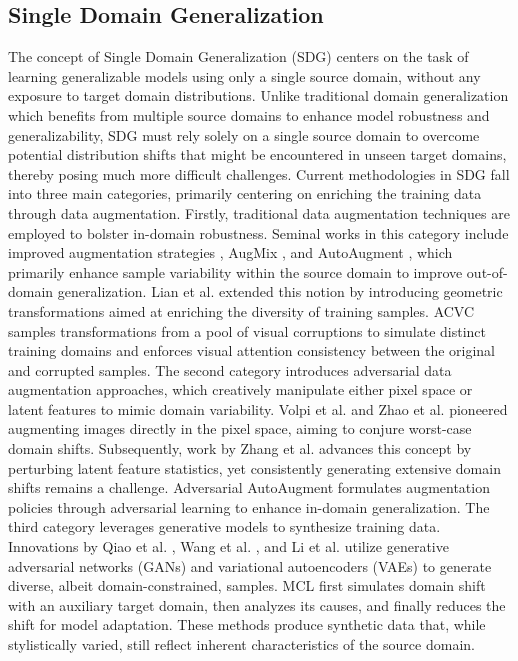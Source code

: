 \subsection{Single Domain Generalization}
The concept of Single Domain Generalization (SDG) centers on 
the task of learning generalizable models using only a single source domain, without any exposure to target domain distributions. 
Unlike traditional domain generalization which benefits from multiple source domains to enhance model robustness and generalizability, 
SDG must rely solely on a single source domain to overcome potential distribution shifts that might be encountered in unseen target domains,
thereby posing much more difficult challenges. 
Current methodologies in SDG fall into three main categories,
primarily centering on enriching the training data through data augmentation. 
Firstly, traditional data augmentation techniques are employed to bolster in-domain robustness.
Seminal works in this category include improved augmentation strategies \cite{devries2017improved}, AugMix \cite{hendrycks2019augmix}, and AutoAugment \cite{Cubuk_2020_CVPR_Workshops}, 
which primarily enhance sample variability within the source domain 
to improve out-of-domain generalization. 
Lian et al. \cite{lian2021geometry} extended this notion by introducing geometric transformations aimed at enriching the diversity of training samples. 
ACVC \cite{Cugu_2022_CVPR} samples transformations from a pool of visual corruptions to simulate distinct training domains and enforces visual attention consistency between the original and corrupted samples.
%
The second category introduces adversarial data augmentation approaches, which creatively manipulate either pixel space or latent features to mimic domain variability. Volpi et al. \cite{volpi2018generalizing} and Zhao et al. \cite{Long2020Maximum} pioneered augmenting images directly in the pixel space, aiming to conjure worst-case domain shifts. Subsequently, work by  Zhang et al. \cite{zhang2023adversarial} advances this concept by perturbing latent feature statistics, yet consistently generating extensive domain shifts remains a challenge. 
Adversarial AutoAugment \cite{zhang2019adversarial} formulates augmentation policies through adversarial learning 
to enhance in-domain generalization.
%
The third category leverages generative models to synthesize training data. Innovations by Qiao et al. \cite{qiao2020learning}, Wang et al. \cite{wang2021learning}, and Li et al. \cite{li2021progressive} utilize generative adversarial networks (GANs) and variational autoencoders (VAEs) to generate diverse, albeit domain-constrained, samples. MCL \cite{chen2023meta} first simulates domain shift with an auxiliary target domain, then analyzes its causes, and finally reduces the shift for model adaptation. These methods produce synthetic data that, while stylistically varied, still reflect inherent characteristics of the source domain.

